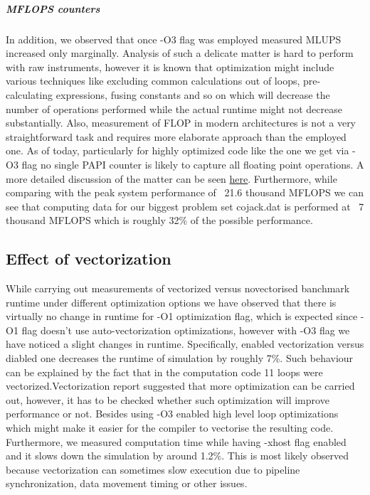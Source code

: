 \documentclass{article}
\begin{document}
\subparagraph{MFLOPS counters}
In addition, we observed that once -O3 flag was employed measured MLUPS increased only marginally. Analysis of such a delicate matter is hard to perform with raw instruments, however it is known that optimization might include various techniques like excluding common calculations out of loops, pre-calculating expressions, fusing constants and so on which will decrease the number of operations performed while the actual runtime might not decrease substantially. Also, measurement of FLOP in modern architectures is not a very straightforward task and requires more elaborate approach than the employed one. As of today, particularly for highly optimized code like the one we get via -O3 flag no single PAPI counter is likely to capture all floating point operations. A more detailed discussion of the matter can be seen \href{http://icl.cs.utk.edu/projects/papi/wiki/PAPITopics:SandyFlops}{here}. Furthermore, while comparing with the peak system performance of ~21.6 thousand MFLOPS we can see that computing data for our biggest problem set cojack.dat is performed at ~7 thousand MFLOPS which is roughly 32\% of the possible performance.

\subsection{Effect of vectorization}
While carrying out measurements of vectorized versus novectorised banchmark runtime under different optimization options we have observed that there is virtually no change in runtime for -O1 optimization flag, which is expected since -O1 flag doesn't use auto-vectorization optimizations, however with -O3 flag we have noticed a slight changes in runtime. Specifically, enabled vectorization versus diabled one decreases the runtime of simulation by roughly 7\%. Such behaviour can be explained by the fact that in the computation code 11 loops were vectorized.Vectorization report suggested that more optimization can be carried out, however, it has to be checked whether such optimization will improve performance or not. Besides using -O3 enabled high level loop optimizations which might make it easier for the compiler to vectorise the resulting code. Furthermore, we measured computation time while having -xhost flag enabled and it slows down the simulation by around 1.2\%. This is most likely observed because vectorization can sometimes slow execution due to pipeline synchronization, data movement timing or other issues.

\end{document}
